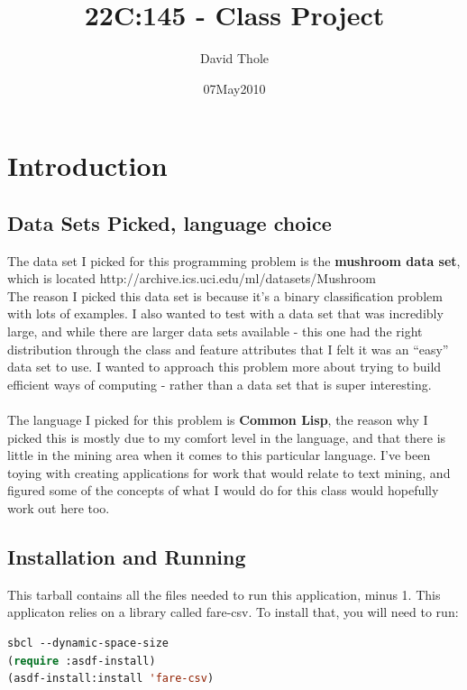 \documentclass{article}
\begin{document}
\title{22C:145 - Class Project}
\author{David Thole}
\date{07May2010}

\thispagestyle{plain}           %
\tableofcontents
{} %
\cleardoublepage                %

\section{Introduction}
\subsection{Data Sets Picked, language choice}
The data set I picked for this programming problem is the \textbf{mushroom data set}, which is located http://archive.ics.uci.edu/ml/datasets/Mushroom \\
The reason I picked this data set is because it's a binary classification problem with lots of examples.  I also wanted to test with a data set that was incredibly large, and while there are larger data sets available - this one had the right distribution through the class and feature attributes that I felt it was an ``easy'' data set to use.  I wanted to approach this problem more about trying to build efficient ways of computing - rather than a data set that is super interesting. \\
\\
The language I picked for this problem is \textbf{Common Lisp}, the reason why I picked this is mostly due to my comfort level in the language, and that there is little in the mining area when it comes to this particular language.  I've been toying with creating applications for work that would relate to text mining, and figured some of the concepts of what I would do for this class would hopefully work out here too.

\subsection{Installation and Running}
This tarball contains all the files needed to run this application, minus 1.  This applicaton relies on a library called fare-csv.  To install that, you will need to run:

\begin{lstlisting}[frame=single,language=lisp]
sbcl --dynamic-space-size
(require :asdf-install)
(asdf-install:install 'fare-csv)
\end{lstlisting}
\end{document}
